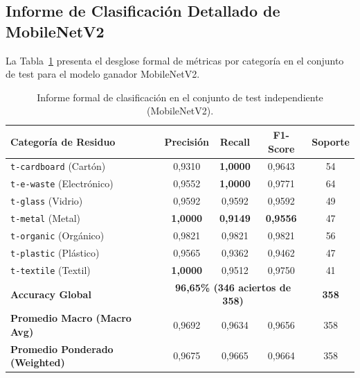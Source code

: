 \documentclass[11pt,a4paper]{article}
\begin{document}
\subsection{Informe de Clasificación Detallado de MobileNetV2}
La Tabla~\ref{tab:classification_report} presenta el desglose formal de métricas por categoría en el conjunto de test para el modelo ganador MobileNetV2.

\begin{table}[H]
\centering
\caption{Informe formal de clasificación en el conjunto de test independiente (MobileNetV2).}
\label{tab:classification_report}
\renewcommand{\arraystretch}{1.18}
\begin{tabular}{lcccc}
\toprule
\textbf{Categoría de Residuo} & \textbf{Precisión} & \textbf{Recall} & \textbf{F1-Score} & \textbf{Soporte} \\
\midrule
\texttt{t-cardboard} (Cartón)     & 0,9310 & \textbf{1,0000} & 0,9643 & 54 \\
\texttt{t-e-waste} (Electrónico)  & 0,9552 & \textbf{1,0000} & 0,9771 & 64 \\
\texttt{t-glass} (Vidrio)         & 0,9592 & 0,9592 & 0,9592 & 49 \\
\texttt{t-metal} (Metal)          & \textbf{1,0000} & \textbf{0,9149} & \textbf{0,9556} & 47 \\
\texttt{t-organic} (Orgánico)     & 0,9821 & 0,9821 & 0,9821 & 56 \\
\texttt{t-plastic} (Plástico)     & 0,9565 & 0,9362 & 0,9462 & 47 \\
\texttt{t-textile} (Textil)       & \textbf{1,0000} & 0,9512 & 0,9750 & 41 \\
\midrule
\textbf{Accuracy Global}          & \multicolumn{3}{c}{\textbf{96,65\% (346 aciertos de 358)}} & \textbf{358} \\
\textbf{Promedio Macro (Macro Avg)} & 0,9692 & 0,9634 & 0,9656 & 358 \\
\textbf{Promedio Ponderado (Weighted)} & 0,9675 & 0,9665 & 0,9664 & 358 \\
\bottomrule
\end{tabular}
\end{table}
\end{document}
